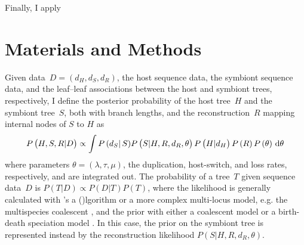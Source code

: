 \documentclass[12pt,letterpaper]{article}
\newcommand{\aposcite}[2]{\citeauthor{#1}'s #2 (\citeyear{#1})}
\begin{document}
Finally, I apply 

\section*{Materials and Methods}


%
%
%

Given data~$D = \left(d_H,d_S,d_R\right)$, the host sequence data, the symbiont sequence data, and the leaf--leaf associations between the host and symbiont trees, respectively, I define the posterior probability of the host tree~$H$ and the symbiont tree~$S$, both with branch lengths, and the reconstruction~$R$ mapping internal nodes of $S$ to $H$ as
\begin{equation}
P\left(H,S,R|D\right) \propto \int P\left(d_S\right|S) P\left(S|H,R,d_R,\theta\right) P\left(H|d_H\right) P\left(R\right) P\left(\theta\right) \, \dif \theta
\label{eq:cophylogenyposterior}
\end{equation}
where parameters $\theta = \left(\lambda,\tau,\mu\right)$, the duplication, host-switch, and loss rates, respectively, and are integrated out. The probability of a tree~$T$ given sequence data~$D$ is $P\left(T|D\right) \propto P\left(D|T\right) P\left(T\right)$, where the likelihood is generally calculated with \aposcite{Felsenstein:1981} algorithm or a more complex multi-locus model, e.g. the multispecies coalescent \parencite{Heled:2010a}, and the prior with either a coalescent model \parencite{Kingman:1982} or a birth-death speciation model \parencite{Gernhard:2008}. In this case, the prior on the symbiont tree is represented instead by the reconstruction likelihood $P\left(S|H,R,d_R,\theta\right)$.
\end{document}
